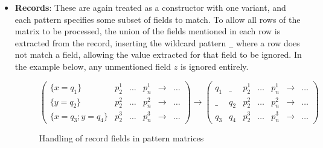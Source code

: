 \begin{itemize}
\item \textbf{Records}: These are again treated as a constructor with one variant, and each pattern specifies some subset of fields to match. To allow all rows of the matrix to be processed,  the union of the fields mentioned in each row is extracted from the record, inserting the wildcard pattern \verb|_| where a row does not match a field, allowing the value extracted for that field to be ignored. In the example below, any unmentioned field $z$ is ignored entirely.
\begin{figure}[H]
\hfill
$
\begin{pmatrix}
\{x=q_1\} & p^1_2 & \dots & p^1_n & \to & \dots \\
\{y=q_2\} & p^2_2 & \dots & p^2_n & \to &\dots \\
\{x=q_3; y=q_4\} & p^3_2 & \dots & p^3_n & \to &\dots
\end{pmatrix}
\to
\begin{pmatrix}
q_1 & \_ & p^1_2 & \dots & p^1_n  & \to & \dots \\
\_ & q_2 & p^2_2 & \dots & p^2_n  & \to & \dots \\
 q_3 & q_4 & p^3_2 & \dots & p^3_n  & \to & \dots
\end{pmatrix}
$
\hfill
\caption{Handling of record fields in pattern matrices}
\end{figure}
\end{itemize}



